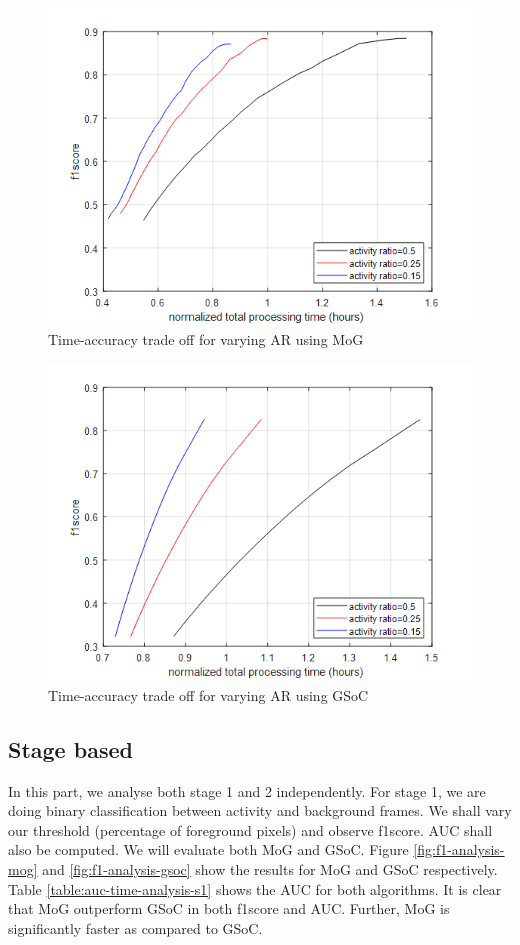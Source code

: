 \begin{figure}
    \centering
    \includegraphics[width=\linewidth]{images/time-acc-tradeoff-ar-mog.png}
    \caption{Time-accuracy trade off for varying AR using MoG}
    \label{fig:time-acc-tradeoff-ar-mog}
\end{figure}

\begin{figure}
    \centering
    \includegraphics[width=\linewidth]{images/time-acc-tradeoff-ar-gsoc.png}
    \caption{Time-accuracy trade off for varying AR using GSoC}
    \label{fig:time-acc-tradeoff-ar-gsoc}
\end{figure}


\subsection{Stage based }
In this part, we analyse both stage 1 and 2 independently. For stage 1, we are doing binary classification between activity and background frames. We shall vary our threshold (percentage of foreground pixels) and observe f1score. AUC shall also be computed. We will evaluate both MoG and GSoC. Figure \ref{fig:f1-analysis-mog} and \ref{fig:f1-analysis-gsoc} show the results for MoG and GSoC respectively. Table \ref{table:auc-time-analysis-s1} shows the AUC for both algorithms. It is clear that MoG outperform GSoC in both f1score and AUC. Further, MoG is significantly faster as compared to GSoC.   

